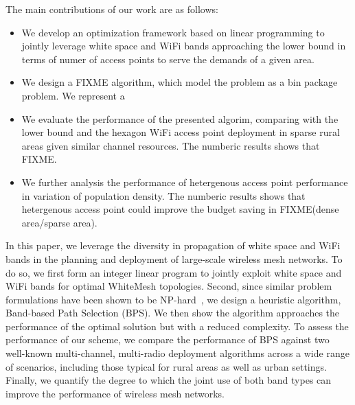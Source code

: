 The main contributions of our work are as follows:
\begin{itemize}
\item We develop an optimization framework based on linear programming to jointly leverage white space and WiFi 
bands approaching the lower bound in terms of numer of access points to serve the demands of a given area.
\item We design a FIXME algorithm, which model the problem as a bin package problem. We represent a 
\item We evaluate the performance of the presented algorim, comparing with the lower bound and the hexagon
WiFi access point deployment in sparse rural areas given similar channel resources. The numberic results shows that FIXME.  
\item We further analysis the performance of hetergenous access point performance in variation of population density. The
numberic results shows that hetergenous access point could improve the budget saving in FIXME(dense area/sparse area). 
\end{itemize}















In this paper, we leverage the diversity in propagation of
white space and WiFi bands in the planning and deployment
of large-scale wireless mesh networks. To do so, we first form an
integer linear program to jointly exploit 
white space and WiFi bands for optimal WhiteMesh topologies.
Second, since similar problem formulations have been shown to be 
NP-hard~\cite{jain2005impact}, we design a heuristic algorithm, 
Band-based Path Selection (BPS). We then
show the algorithm approaches the performance of the 
optimal solution but with a reduced complexity. To assess the 
performance of our scheme, we compare the performance of 
BPS against two well-known multi-channel, multi-radio deployment 
algorithms across a wide range of scenarios, including those
typical for rural areas as well as urban settings. Finally, we
quantify the degree to which the joint use of both band types can improve the 
performance of wireless mesh networks.

